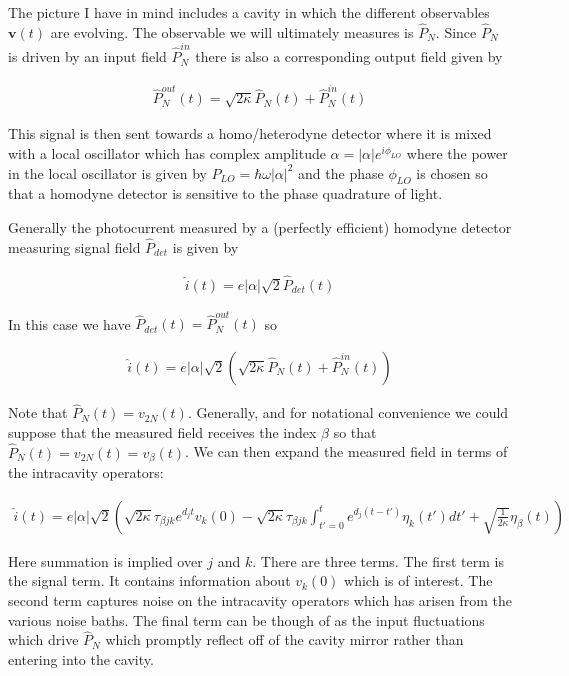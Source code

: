 \documentclass[12pt]{article}
\newcommand{\bv}[1]{\boldsymbol{#1}}
\begin{document}
The picture I have in mind includes a cavity in which the different observables $\bv{v}(t)$ are evolving. The observable we will ultimately measures is $\hat{P}_N$. Since $\hat{P}_N$ is driven by an input field $\hat{P}_N^{in}$ there is also a corresponding output field given by

\begin{align}
\hat{P}_N^{out}(t) = \sqrt{2\kappa}\hat{P}_N(t) + \hat{P}_N^{in}(t)
\end{align}

This signal is then sent towards a homo/heterodyne detector where it is mixed with a local oscillator which has complex amplitude $\alpha = |\alpha|e^{i\phi_{LO}}$ where the power in the local oscillator is given by $P_{LO} = \hbar \omega|\alpha|^2$ and the phase $\phi_{LO}$ is chosen so that a homodyne detector is sensitive to the phase quadrature of light.

Generally the photocurrent measured by a (perfectly efficient) homodyne detector measuring signal field $\hat{P}_{det}$ is given by

\begin{align}
\hat{i}(t) = e|\alpha| \sqrt{2}\hat{P}_{det}(t)
\end{align}

In this case we have $\hat{P}_{det}(t) = \hat{P}_N^{out}(t)$ so

\begin{align}
\hat{i}(t) = e|\alpha|\sqrt{2} \left(\sqrt{2\kappa} \hat{P}_N(t) + \hat{P}_N^{in}(t)\right)
\end{align}

Note that $\hat{P}_N(t) = v_{2N}(t)$. Generally, and for notational convenience we could suppose that the measured field receives the index $\beta$ so that $\hat{P}_N(t) = v_{2N}(t) = v_{\beta}(t)$. We can then expand the measured field in terms of the intracavity operators:

\begin{align}
\hat{i}(t) = e|\alpha|\sqrt{2}\left(\sqrt{2\kappa} \tau_{\beta jk}e^{d_j t} v_k(0) - \sqrt{2\kappa} \tau_{\beta jk}\int_{t'=0}^t e^{d_j(t-t')} \eta_k(t')dt' + \sqrt{\frac{1}{2\kappa}}\eta_\beta(t) \right)
\end{align}

Here summation is implied over $j$ and $k$. There are three terms. The first term is the signal term. It contains information about $v_k(0)$ which is of interest. The second term captures noise on the intracavity operators which has arisen from the various noise baths. The final term can be though of as the input fluctuations which drive $\hat{P}_N$ which promptly reflect off of the cavity mirror rather than entering into the cavity.
\end{document}
